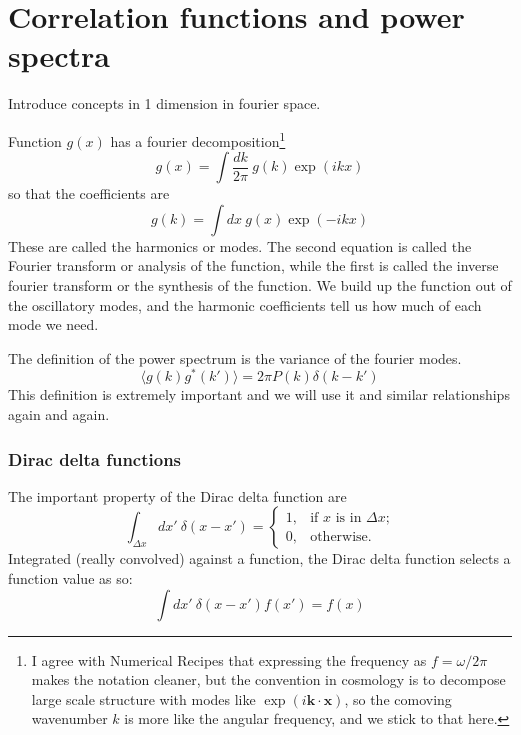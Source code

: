 \chapter{Correlation functions and power spectra}

Introduce concepts in 1 dimension in fourier space.

Function $g(x)$ has a fourier decomposition\footnote{I agree with Numerical Recipes \citep{} that expressing the frequency as $f = \omega/2\pi$ makes the notation cleaner, but the convention in cosmology is to decompose large scale structure with modes like $\exp(i \mathbf{k} \cdot \mathbf{x})$, so the comoving wavenumber $k$ is more like the angular frequency, and we stick to that here.}
\begin{equation}
  g(x) = \int \frac{dk}{2\pi}\ g(k) \exp(i kx) 
\end{equation}
so that the coefficients are 
\begin{equation}
  g(k) = \int dx\ g(x) \exp(-i kx)
\end{equation}
These are called the harmonics or modes.  The second equation is called the Fourier transform or analysis of the function, while the first is called the inverse fourier transform or the synthesis of the function.  We build up the function out of the oscillatory modes, and the harmonic coefficients tell us how much of each mode we need.

The definition of the power spectrum is the variance of the fourier modes.
\begin{equation}
  \langle g(k) g^*(k') \rangle = 2\pi P(k) \delta(k - k') 
\end{equation}
This definition is extremely important and we will use it and similar relationships again and again.

\subsection{Dirac delta functions}
The important property of the Dirac delta function are
\begin{equation}
  \int_{\Delta x} dx'\ \delta(x-x') = \left\{
  \begin{array}{ll} 1, & \mbox{if $x$ is in $\Delta x$;} \\ 0, & \mbox{otherwise.} \end{array}
  \right.
\end{equation}
Integrated (really convolved) against a function, the Dirac delta function selects a function value as so:
\begin{equation}
  \int dx'\ \delta(x-x') f(x') = f(x)
\end{equation}


